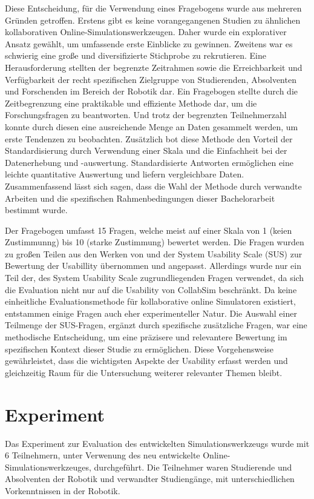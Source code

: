\documentclass[german,version-2020-11]{uzl-thesis}
\begin{document}
  Diese Entscheidung, für die Verwendung eines Fragebogens wurde aus mehreren Gründen getroffen.
  Erstens gibt es keine vorangegangenen Studien zu ähnlichen kollaborativen Online-Simulationswerkzeugen. 
  Daher wurde ein explorativer Ansatz gewählt, um umfassende erste Einblicke zu gewinnen.
  Zweitens war es schwierig eine große und diversifizierte Stichprobe zu rekrutieren. 
  Eine Herausforderung stellten der begrenzte Zeitrahmen sowie die Erreichbarkeit und Verfügbarkeit der recht spezifischen Zielgruppe von Studierenden, Absolventen und Forschenden im Bereich der Robotik dar.
  Ein Fragebogen stellte durch die Zeitbegrenzung eine praktikable und effiziente Methode dar, um die Forschungsfragen zu beantworten.
  Und trotz der begrenzten Teilnehmerzahl konnte durch diesen eine ausreichende Menge an Daten gesammelt werden, um erste Tendenzen zu beobachten.
  Zusätzlich bot diese Methode den Vorteil der Standardisierung durch Verwendung einer Skala und die Einfachheit bei der Datenerhebung und -auswertung. 
  Standardisierte Antworten ermöglichen eine leichte quantitative Auswertung und liefern vergleichbare Daten.
  Zusammenfassend lässt sich sagen, dass die Wahl der Methode durch verwandte Arbeiten und die spezifischen Rahmenbedingungen dieser Bachelorarbeit bestimmt wurde. 

  Der Fragebogen umfasst 15 Fragen, welche meist auf einer Skala von 1 (keien Zustimmunng) bis 10 (starke Zustimmung) bewertet werden.
  Die Fragen wurden zu großen Teilen aus den Werken von \cite{Schiller2023} und der System Usability Scale (SUS) \cite{Brooke1995} zur Bewertung der Usabillity übernommen und angepasst.
  Allerdings wurde nur ein Teil der, des System Usability Scale zugrundliegenden Fragen verwendet, da sich die Evaluation nicht nur auf die Usability von CollabSim beschränkt.
  Da keine einheitliche Evaluationsmethode für kollaborative online Simulatoren existiert, entstammen einige Fragen auch eher experimenteller Natur.
  Die Auswahl einer Teilmenge der SUS-Fragen, ergänzt durch spezifische zusätzliche Fragen, war eine methodische Entscheidung, 
  um eine präzisere und relevantere Bewertung im spezifischen Kontext dieser Studie zu ermöglichen. 
  Diese Vorgehensweise gewährleistet, dass die wichtigsten Aspekte der Usability erfasst werden und gleichzeitig Raum für die Untersuchung weiterer relevanter Themen bleibt.

\section{Experiment}
  Das Experiment zur Evaluation des entwickelten Simulationswerkzeugs wurde mit 6 Teilnehmern, unter Verwenung des neu entwickelte Online-Simulationswerkzeuges, durchgeführt. 
  Die Teilnehmer waren Studierende und Absolventen der Robotik und verwandter Studiengänge, mit unterschiedlichen Vorkenntnissen in der Robotik.
\end{document}
